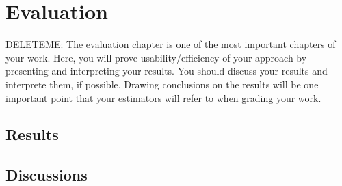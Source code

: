\chapter{Evaluation}
\label{evaluation}
DELETEME: The evaluation chapter is one of the most important chapters of your work. Here, you will prove usability/efficiency of your approach by presenting and interpreting your results. You should discuss your results and interprete them, if possible. Drawing conclusions on the results will be one important point that your estimators will refer to when grading your work.

\section{Results}
\label{results}

\section{Discussions}
\label{discussions}